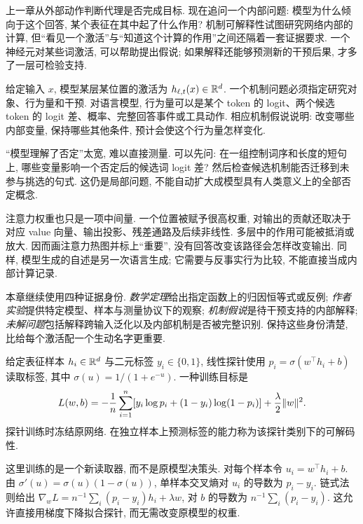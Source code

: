 \label{ch:interp}
上一章从外部动作判断代理是否完成目标. 现在追问一个内部问题: 模型为什么倾向于这个回答, 某个表征在其中起了什么作用? 机制可解释性试图研究网络内部的计算, 但“看见一个激活”与“知道这个计算的作用”之间还隔着一套证据要求. 一个神经元对某些词激活, 可以帮助提出假说; 如果解释还能够预测新的干预后果, 才多了一层可检验支持.

\begin{definition}
给定输入 $x$, 模型某层某位置的激活为 $h_{\ell,t}(x)\in\mathbb R^d$. 一个机制问题必须指定研究对象、行为量和干预. 对语言模型, 行为量可以是某个 token 的 logit、两个候选 token 的 logit 差、概率、完整回答事件或工具动作. 相应机制假说说明: 改变哪些内部变量, 保持哪些其他条件, 预计会使这个行为量怎样变化.
\end{definition}
“模型理解了否定”太宽, 难以直接测量. 可以先问: 在一组控制词序和长度的短句上, 哪些变量影响一个否定后的候选词 logit 差? 然后检查候选机制能否迁移到未参与挑选的句式. 这仍是局部问题, 不能自动扩大成模型具有人类意义上的全部否定概念.

注意力权重也只是一项中间量. 一个位置被赋予很高权重, 对输出的贡献还取决于对应 value 向量、输出投影、残差通路及后续非线性. 多层中的作用可能被抵消或放大. 因而画注意力热图并标上“重要”, 没有回答改变该路径会怎样改变输出. 同样, 模型生成的自述是另一次语言生成; 它需要与反事实行为比较, 不能直接当成内部计算记录.

本章继续使用四种证据身份. \emph{数学定理}给出指定函数上的归因恒等式或反例; \emph{作者实验}提供特定模型、样本与测量协议下的观察; \emph{机制假说}是待干预支持的内部解释; \emph{未解问题}包括解释跨输入泛化以及内部机制是否被完整识别. 保持这些身份清楚, 比给每个激活配一个生动名字更重要.

\begin{definition}
给定表征样本 $h_i\in\mathbb R^d$ 与二元标签 $y_i\in\{0,1\}$, 线性探针使用 $p_i=\sigma(w^\top h_i+b)$ 读取标签, 其中 $\sigma(u)=1/(1+e^{-u})$. 一种训练目标是
\[
L(w,b)=-\frac1n\sum_{i=1}^n[y_i\log p_i+(1-y_i)\log(1-p_i)]+\frac\lambda2\lVert w\rVert^2.
\]
探针训练时冻结原网络. 在独立样本上预测标签的能力称为该探针类别下的可解码性.
\end{definition}
这里训练的是一个新读取器, 而不是原模型决策头. 对每个样本令 $u_i=w^\top h_i+b$. 由 $\sigma'(u)=\sigma(u)(1-\sigma(u))$, 单样本交叉熵对 $u_i$ 的导数为 $p_i-y_i$. 链式法则给出 $\nabla_wL=n^{-1}\sum_i(p_i-y_i)h_i+\lambda w$, 对 $b$ 的导数为 $n^{-1}\sum_i(p_i-y_i)$. 这允许直接用梯度下降拟合探针, 而无需改变原模型的权重.

